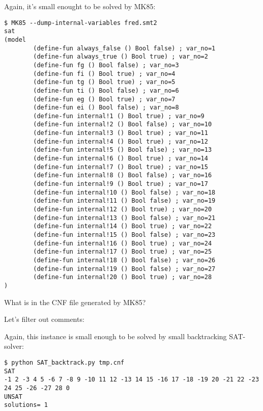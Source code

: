 

Again, it's small enought to be solved by MK85:

\begin{lstlisting}
$ MK85 --dump-internal-variables fred.smt2
sat
(model
        (define-fun always_false () Bool false) ; var_no=1
        (define-fun always_true () Bool true) ; var_no=2
        (define-fun fg () Bool false) ; var_no=3
        (define-fun fi () Bool true) ; var_no=4
        (define-fun tg () Bool true) ; var_no=5
        (define-fun ti () Bool false) ; var_no=6
        (define-fun eg () Bool true) ; var_no=7
        (define-fun ei () Bool false) ; var_no=8
        (define-fun internal!1 () Bool true) ; var_no=9
        (define-fun internal!2 () Bool false) ; var_no=10
        (define-fun internal!3 () Bool true) ; var_no=11
        (define-fun internal!4 () Bool true) ; var_no=12
        (define-fun internal!5 () Bool false) ; var_no=13
        (define-fun internal!6 () Bool true) ; var_no=14
        (define-fun internal!7 () Bool true) ; var_no=15
        (define-fun internal!8 () Bool false) ; var_no=16
        (define-fun internal!9 () Bool true) ; var_no=17
        (define-fun internal!10 () Bool false) ; var_no=18
        (define-fun internal!11 () Bool false) ; var_no=19
        (define-fun internal!12 () Bool true) ; var_no=20
        (define-fun internal!13 () Bool false) ; var_no=21
        (define-fun internal!14 () Bool true) ; var_no=22
        (define-fun internal!15 () Bool false) ; var_no=23
        (define-fun internal!16 () Bool true) ; var_no=24
        (define-fun internal!17 () Bool true) ; var_no=25
        (define-fun internal!18 () Bool false) ; var_no=26
        (define-fun internal!19 () Bool false) ; var_no=27
        (define-fun internal!20 () Bool true) ; var_no=28
)
\end{lstlisting}

What is in the CNF file generated by MK85?



Let's filter out comments:



Again, this instance is small enough to be solved by small backtracking SAT-solver:

\begin{lstlisting}
$ python SAT_backtrack.py tmp.cnf
SAT
-1 2 -3 4 5 -6 7 -8 9 -10 11 12 -13 14 15 -16 17 -18 -19 20 -21 22 -23 24 25 -26 -27 28 0
UNSAT
solutions= 1
\end{lstlisting}

